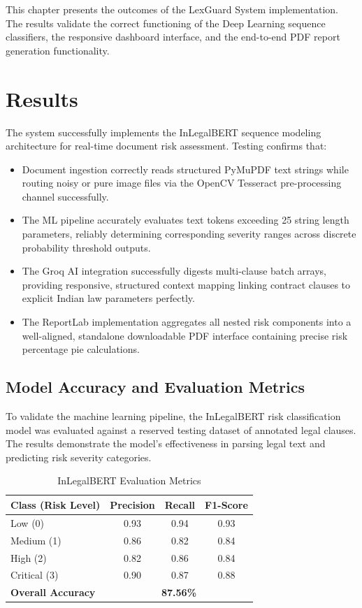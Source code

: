 \documentclass[a4paper,12pt]{report}
\begin{document}
This chapter presents the outcomes of the LexGuard System implementation. The results validate the correct functioning of the Deep Learning sequence classifiers, the responsive dashboard interface, and the end-to-end PDF report generation functionality.

\section{Results}

The system successfully implements the InLegalBERT sequence modeling architecture for real-time document risk assessment. Testing confirms that:

\begin{itemize}
    \item Document ingestion correctly reads structured PyMuPDF text strings while routing noisy or pure image files via the OpenCV Tesseract pre-processing channel successfully.
    \item The ML pipeline accurately evaluates text tokens exceeding 25 string length parameters, reliably determining corresponding severity ranges across discrete probability threshold outputs. 
    \item The Groq AI integration successfully digests multi-clause batch arrays, providing responsive, structured context mapping linking contract clauses to explicit Indian law parameters perfectly.
    \item The ReportLab implementation aggregates all nested risk components into a well-aligned, standalone downloadable PDF interface containing precise risk percentage pie calculations.
\end{itemize}

\subsection{Model Accuracy and Evaluation Metrics}

To validate the machine learning pipeline, the InLegalBERT risk classification model was evaluated against a reserved testing dataset of annotated legal clauses. The results demonstrate the model's effectiveness in parsing legal text and predicting risk severity categories.

\begin{table}[H]
\centering
\caption{InLegalBERT Evaluation Metrics}
\vspace{6pt}
\renewcommand{\arraystretch}{1.3}
\begin{tabular}{|l|c|c|c|}
\hline
\textbf{Class (Risk Level)} & \textbf{Precision} & \textbf{Recall} & \textbf{F1-Score} \\
\hline
Low (0) & 0.93 & 0.94 & 0.93 \\
Medium (1) & 0.86 & 0.82 & 0.84 \\
High (2) & 0.82 & 0.86 & 0.84 \\
Critical (3) & 0.90 & 0.87 & 0.88 \\
\hline
\textbf{Overall Accuracy} & \multicolumn{3}{c|}{\textbf{87.56\%}} \\
\hline
\end{tabular}
\end{table}
\end{document}
